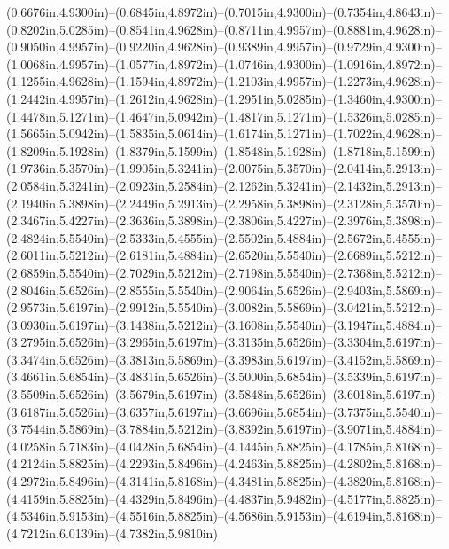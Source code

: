 (0.6676in,4.9300in)--(0.6845in,4.8972in)--(0.7015in,4.9300in)--(0.7354in,4.8643in)--(0.8202in,5.0285in)--(0.8541in,4.9628in)--(0.8711in,4.9957in)--(0.8881in,4.9628in)--(0.9050in,4.9957in)--(0.9220in,4.9628in)--(0.9389in,4.9957in)--(0.9729in,4.9300in)--(1.0068in,4.9957in)--(1.0577in,4.8972in)--(1.0746in,4.9300in)--(1.0916in,4.8972in)--(1.1255in,4.9628in)--(1.1594in,4.8972in)--(1.2103in,4.9957in)--(1.2273in,4.9628in)--(1.2442in,4.9957in)--(1.2612in,4.9628in)--(1.2951in,5.0285in)--(1.3460in,4.9300in)--(1.4478in,5.1271in)--(1.4647in,5.0942in)--(1.4817in,5.1271in)--(1.5326in,5.0285in)--(1.5665in,5.0942in)--(1.5835in,5.0614in)--(1.6174in,5.1271in)--(1.7022in,4.9628in)--(1.8209in,5.1928in)--(1.8379in,5.1599in)--(1.8548in,5.1928in)--(1.8718in,5.1599in)--(1.9736in,5.3570in)--(1.9905in,5.3241in)--(2.0075in,5.3570in)--(2.0414in,5.2913in)--(2.0584in,5.3241in)--(2.0923in,5.2584in)--(2.1262in,5.3241in)--(2.1432in,5.2913in)--(2.1940in,5.3898in)--(2.2449in,5.2913in)--(2.2958in,5.3898in)--(2.3128in,5.3570in)--(2.3467in,5.4227in)--(2.3636in,5.3898in)--(2.3806in,5.4227in)--(2.3976in,5.3898in)--(2.4824in,5.5540in)--(2.5333in,5.4555in)--(2.5502in,5.4884in)--(2.5672in,5.4555in)--(2.6011in,5.5212in)--(2.6181in,5.4884in)--(2.6520in,5.5540in)--(2.6689in,5.5212in)--(2.6859in,5.5540in)--(2.7029in,5.5212in)--(2.7198in,5.5540in)--(2.7368in,5.5212in)--(2.8046in,5.6526in)--(2.8555in,5.5540in)--(2.9064in,5.6526in)--(2.9403in,5.5869in)--(2.9573in,5.6197in)--(2.9912in,5.5540in)--(3.0082in,5.5869in)--(3.0421in,5.5212in)--(3.0930in,5.6197in)--(3.1438in,5.5212in)--(3.1608in,5.5540in)--(3.1947in,5.4884in)--(3.2795in,5.6526in)--(3.2965in,5.6197in)--(3.3135in,5.6526in)--(3.3304in,5.6197in)--(3.3474in,5.6526in)--(3.3813in,5.5869in)--(3.3983in,5.6197in)--(3.4152in,5.5869in)--(3.4661in,5.6854in)--(3.4831in,5.6526in)--(3.5000in,5.6854in)--(3.5339in,5.6197in)--(3.5509in,5.6526in)--(3.5679in,5.6197in)--(3.5848in,5.6526in)--(3.6018in,5.6197in)--(3.6187in,5.6526in)--(3.6357in,5.6197in)--(3.6696in,5.6854in)--(3.7375in,5.5540in)--(3.7544in,5.5869in)--(3.7884in,5.5212in)--(3.8392in,5.6197in)--(3.9071in,5.4884in)--(4.0258in,5.7183in)--(4.0428in,5.6854in)--(4.1445in,5.8825in)--(4.1785in,5.8168in)--(4.2124in,5.8825in)--(4.2293in,5.8496in)--(4.2463in,5.8825in)--(4.2802in,5.8168in)--(4.2972in,5.8496in)--(4.3141in,5.8168in)--(4.3481in,5.8825in)--(4.3820in,5.8168in)--(4.4159in,5.8825in)--(4.4329in,5.8496in)--(4.4837in,5.9482in)--(4.5177in,5.8825in)--(4.5346in,5.9153in)--(4.5516in,5.8825in)--(4.5686in,5.9153in)--(4.6194in,5.8168in)--(4.7212in,6.0139in)--(4.7382in,5.9810in)
